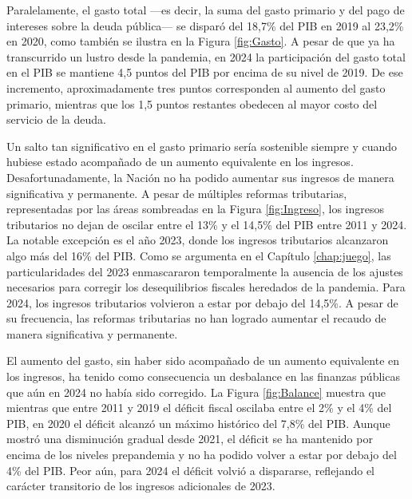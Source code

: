 Paralelamente, el gasto total —es decir, la suma del gasto primario y del pago de intereses sobre la deuda pública— se disparó del 18,7\% del PIB en 2019 al 23,2\% en 2020, como también se ilustra en la Figura \ref{fig:Gasto}. A pesar de que ya ha transcurrido un lustro desde la pandemia, en 2024 la participación del gasto total en el PIB se mantiene 4,5 puntos del PIB por encima de su nivel de 2019. De ese incremento, aproximadamente tres puntos corresponden al aumento del gasto primario, mientras que los 1,5 puntos restantes obedecen al mayor costo del servicio de la deuda.




Un salto tan significativo en el gasto primario sería sostenible siempre y cuando hubiese estado acompañado de un aumento equivalente en los ingresos. Desafortunadamente, la Nación no ha podido aumentar sus ingresos de manera significativa y permanente. A pesar de  múltiples reformas tributarias, representadas por las áreas sombreadas en la Figura \ref{fig:Ingreso}, los ingresos tributarios no dejan de oscilar entre el 13\% y el 14,5\% del PIB entre 2011 y 2024. La notable excepción es el año 2023, donde los ingresos tributarios alcanzaron algo más del 16\% del PIB. Como se argumenta en el Capítulo \ref{chap:juego}, las particularidades del 2023 enmascararon temporalmente la ausencia de los ajustes necesarios para corregir los desequilibrios fiscales heredados de la pandemia. Para 2024, los ingresos tributarios volvieron a estar por debajo del 14,5\%. A pesar de su frecuencia, las reformas tributarias no han logrado aumentar el recaudo de manera significativa y permanente. 




El aumento del gasto, sin haber sido acompañado de un aumento equivalente en los ingresos, ha tenido como consecuencia un desbalance en las finanzas públicas que aún en 2024 no había sido corregido. La Figura \ref{fig:Balance} muestra que mientras que entre 2011 y 2019 el déficit fiscal oscilaba entre el 2\% y el 4\% del PIB, en 2020 el déficit alcanzó un máximo histórico del 7,8\% del PIB. Aunque mostró una disminución gradual desde 2021, el déficit se ha mantenido por encima de los niveles prepandemia y no ha podido volver a estar por debajo del 4\% del PIB. Peor aún, para 2024 el déficit volvió a dispararse, reflejando el carácter transitorio de los ingresos adicionales de 2023. 


